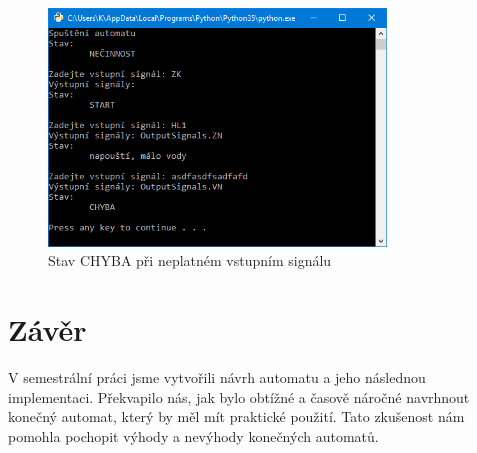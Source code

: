 \documentclass[12pt]{report}
\begin{document}
\begin{figure}[h]
		\centering
		\includegraphics[width=0.8\textwidth]{./images/app_error.png}	
		\caption{Stav CHYBA při neplatném vstupním signálu}
\end{figure}

\chapter{Závěr}
V semestrální práci jsme vytvořili návrh automatu a jeho následnou implementaci.
Překvapilo nás, jak bylo obtížné a časově náročné navrhnout konečný automat, který by měl mít praktické použití. Tato zkušenost nám pomohla pochopit výhody a nevýhody konečných automatů.
\end{document}
